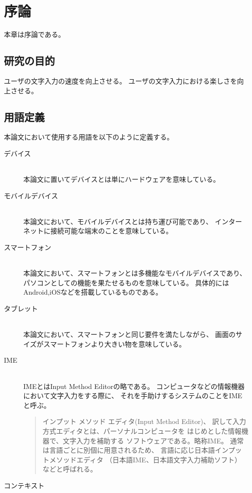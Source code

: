 \chapter{序論}
\label{chap:introduction}
本章は序論である。

\newpage
\section{研究の目的}
ユーザの文字入力の速度を向上させる。
ユーザの文字入力における楽しさを向上させる。
\section{用語定義}

本論文において使用する用語を以下のように定義する。

\begin{description}
  \item[デバイス]\mbox{}\\
    本論文に置いてデバイスとは単にハードウェアを意味している。
  \item[モバイルデバイス]\mbox{}\\
    本論文において、モバイルデバイスとは持ち運び可能であり、
    インターネットに接続可能な端末のことを意味している。
  \item[スマートフォン]\mbox{}\\
    本論文において、スマートフォンとは多機能なモバイルデバイスであり、
    パソコンとしての機能を果たせるものを意味している。
    具体的にはAndroid,iOSなどを搭載しているものである。
  \item[タブレット]\mbox{}\\
    本論文において、スマートフォンと同じ要件を満たしながら、
    画面のサイズがスマートフォンより大きい物を意味している。
  \item[IME]\mbox{}\\
    IMEとはInput Method Editorの略である。
    コンピュータなどの情報機器において文字入力をする際に、
    それを手助けするシステムのことをIMEと呼ぶ。
    \begin{quote}
      インプット メソッド エディタ(Input Method Editor)、
      訳して入力方式エディタとは、パーソナルコンピュータを
      はじめとした情報機器で、文字入力を補助する
      ソフトウェアである。略称IME。
      通常は言語ごとに別個に用意されるため、
      言語に応じ日本語インプットメソッドエディタ
      （日本語IME、日本語文字入力補助ソフト）
      などと呼ばれる。\cite[出典]{ime}
    \end{quote}
  \item[コンテキスト]\mbox{}\\

\end{description}
